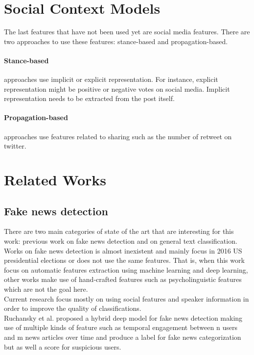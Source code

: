 \section{Social Context Models}
The last features that have not been used yet are social media features. There are two approaches to use these features: stance-based and propagation-based. 
\paragraph{Stance-based} approaches use implicit or explicit representation. For instance, explicit representation might be positive or negative votes on social media. Implicit representation needs to be extracted from the post itself. 
\paragraph{Propagation-based} approaches use features related to sharing such as the number of retweet on twitter. 
\section{Related Works}
\subsection{Fake news detection}
There are two main categories of state of the art that are interesting for this work: previous work on fake news detection and on general text classification. Works on fake news detection is almost inexistent and mainly focus in 2016 US presidential elections or does not use the same features. That is, when this work focus on automatic features extraction using machine learning and deep learning, other works make use of hand-crafted features\cite{Reis2019,Perez-Rosas2017} such as psycholinguistic features\cite{Pennebaker2001} which are not the goal here. \\

Current research focus mostly on using social features and speaker information in order to improve the quality of classifications.\\

Ruchansky et al.\cite{Ruchansky2017} proposed a hybrid deep model for fake news detection making use of multiple kinds of feature such as temporal engagement between n users and m news articles over time and produce a label for fake news categorization but as well a score for suspicious users.\\

